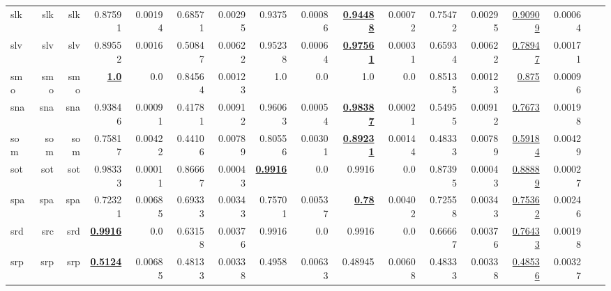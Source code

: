 \documentclass[11pt]{article}
\begin{document}
\begin{table*}[h]
{\begin{tabular}{lrrrrrrrrrrrrrrrr}
slk         & slk         & slk         & 0.87591         & 0.00194         & 0.68571         & 0.00295         & 0.9375         & 0.00086         & \textbf{\underline{0.94488}}         & 0.00072         & 0.75472         & 0.00295         & \underline{0.90909}         & 0.00064         \\
slv         & slv         & slv         & 0.89552         & 0.0016         & 0.50847         & 0.00622         & 0.95238         & 0.00064         & \textbf{\underline{0.97561}}         & 0.00031         & 0.65934         & 0.00622         & \underline{0.78947}         & 0.00171         \\
smo         & smo         & smo         & \textbf{\underline{1.0}}         & 0.0         & 0.84564         & 0.00123         & 1.0         & 0.0         & 1.0         & 0.0         & 0.85135         & 0.00123         & \underline{0.875}         & 0.00096         \\
sna         & sna         & sna         & 0.93846         & 0.00091         & 0.41781         & 0.00912         & 0.96063         & 0.00054         & \textbf{\underline{0.98387}}         & 0.00021         & 0.54955         & 0.00912         & \underline{0.7673}         & 0.00198         \\
som         & som         & som         & 0.75817         & 0.00422         & 0.44106         & 0.00789         & 0.80556         & 0.00301         & \textbf{\underline{0.89231}}         & 0.00144         & 0.48333         & 0.00789         & \underline{0.59184}         & 0.00429         \\
sot         & sot         & sot         & 0.98333         & 0.00011         & 0.86667         & 0.00043         & \textbf{\underline{0.9916}}         & 0.0         & 0.9916         & 0.0         & 0.87395         & 0.00043         & \underline{0.88889}         & 0.00027         \\
spa         & spa         & spa         & 0.72321         & 0.00685         & 0.69333         & 0.00343         & 0.75701         & 0.00537         & \textbf{\underline{0.78}}         & 0.00402         & 0.72558         & 0.00343         & \underline{0.75362}         & 0.00246         \\
srd         & src         & srd         & \textbf{\underline{0.9916}}         & 0.0         & 0.63158         & 0.00376         & 0.9916         & 0.0         & 0.9916         & 0.0         & 0.66667         & 0.00376         & \underline{0.76433}         & 0.00198         \\
srp         & srp         & srp         & \textbf{\underline{0.5124}}         & 0.00685         & 0.48133         & 0.00338         & 0.4958         & 0.00633         & 0.48945         & 0.00608         & 0.48333         & 0.00338         & \underline{0.48536}         & 0.00327         \\

\end{tabular}}
\end{table*}
\end{document}
